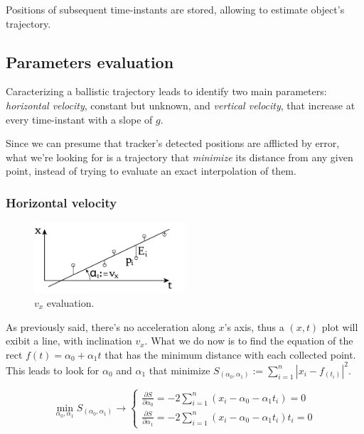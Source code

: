\documentclass[notitlepage,a4paper,11pt]{article} %
\begin{document}
		Positions of subsequent time-instants are stored, allowing to estimate object's trajectory.

	\subsection{Parameters evaluation}

		Caracterizing a ballistic trajectory leads to identify two main parameters: \emph{horizontal velocity}, constant but unknown, and \emph{vertical velocity}, that increase at every time-instant with a slope of $g$.

		Since we can presume that tracker's detected positions are afflicted by error, what we're looking for is a trajectory that \emph{minimize} its distance from any given point, instead of trying to evaluate an exact interpolation of them.

		\subsubsection{Horizontal velocity}

		\begin{figure}[htb]
		\centering \includegraphics[width=0.5\textwidth]{vx}
			\caption{$v_x$ evaluation.}
		\end{figure}

			As previously said, there's no acceleration along $x$'s axis, thus a $(x,t)$ plot will exibit a line, with inclination $v_x$.
			What we do now is to find the equation of the rect $f(t) = \alpha_0 + \alpha_1 t$ that has the minimum distance with each collected point.
			This leads to look for $\alpha_0$ and $\alpha_1$ that minimize $ S_{(\alpha_0, \alpha_1)} := \sum_{i=1}^n | x_i - f_{(t_i)} |^2 $.

			\begin{equation}
				\min_{\alpha_0, \alpha_1} S_{(\alpha_0, \alpha_1)} \to
				\begin{cases}
					\frac{\partial S}{\partial \alpha_0} = -2 \sum_{i=1}^n (x_i - \alpha_0 - \alpha_1 t_i) = 0 \\
					\frac{\partial S}{\partial \alpha_1} = -2 \sum_{i=1}^n (x_i - \alpha_0 - \alpha_1 t_i) t_i = 0
				\end{cases}
			\end{equation}
\end{document}
